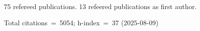 75 refereed publications. 13 refeered publications as first author.

Total citations~=~5054; h-index~=~37 (2025-08-09)